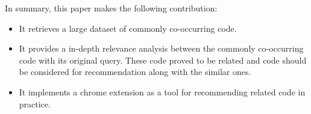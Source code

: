 

In summary, this paper makes the following contribution:
\begin{itemize}
\item It retrieves a large dataset of commonly co-occurring code.
\item It provides a in-depth relevance analysis between the commonly co-occurring code with its original query. These code proved to be related and code should be considered for recommendation along with the similar ones.
\item It implements a chrome extension as a tool for recommending related code in practice.
\end{itemize}

